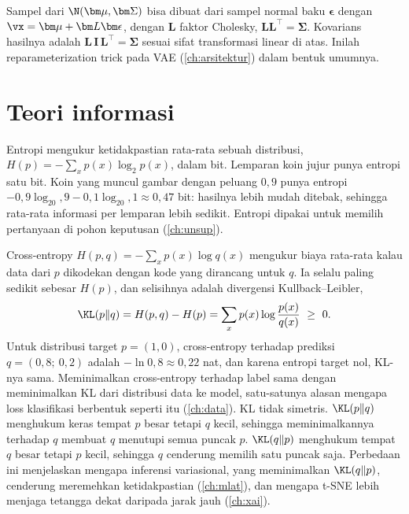 Sampel dari $\N(\bm\mu,\bm\Sigma)$ bisa dibuat dari sampel normal baku $\bm\epsilon$ dengan $\vx=\bm\mu+\bm L\bm\epsilon$, dengan
$\bm L$ faktor Cholesky, $\bm L\bm L^\top=\bm\Sigma$. Kovarians hasilnya adalah $\bm L\,\bm I\,\bm L^\top=\bm\Sigma$ sesuai sifat
transformasi linear di atas. Inilah reparameterization trick pada VAE (\cref{ch:arsitektur}) dalam bentuk umumnya.

\section{Teori informasi}

Entropi mengukur ketidakpastian rata-rata sebuah distribusi, $H(p)=-\sum_xp(x)\log_2p(x)$, dalam bit. Lemparan koin jujur punya
entropi satu bit. Koin yang muncul gambar dengan peluang $0{,}9$ punya entropi
$-0{,}9\log_20{,}9-0{,}1\log_20{,}1\approx0{,}47$ bit: hasilnya lebih mudah ditebak, sehingga rata-rata informasi per lemparan lebih
sedikit. Entropi dipakai untuk memilih pertanyaan di pohon keputusan (\cref{ch:unsup}).

Cross-entropy $H(p,q)=-\sum_xp(x)\log q(x)$ mengukur biaya rata-rata kalau data dari $p$ dikodekan dengan kode yang dirancang untuk
$q$. Ia selalu paling sedikit sebesar $H(p)$, dan selisihnya adalah divergensi Kullback--Leibler,
\begin{equation}
\KL(p\|q)=H(p,q)-H(p)=\sum_xp(x)\log\frac{p(x)}{q(x)}\ \ge\ 0 .
\end{equation}
Untuk distribusi target $p=(1,0)$, cross-entropy terhadap prediksi $q=(0{,}8;\ 0{,}2)$ adalah $-\ln0{,}8\approx0{,}22$ nat, dan karena
entropi target nol, KL-nya sama. Meminimalkan cross-entropy terhadap label sama dengan meminimalkan KL dari distribusi data ke
model, satu-satunya alasan mengapa loss klasifikasi berbentuk seperti itu (\cref{ch:data}). KL tidak simetris. $\KL(p\|q)$ menghukum
keras tempat $p$ besar tetapi $q$ kecil, sehingga meminimalkannya terhadap $q$ membuat $q$ menutupi semua puncak $p$.
$\KL(q\|p)$ menghukum tempat $q$ besar tetapi $p$ kecil, sehingga $q$ cenderung memilih satu puncak saja. Perbedaan ini
menjelaskan mengapa inferensi variasional, yang meminimalkan $\KL(q\|p)$, cenderung meremehkan ketidakpastian
(\cref{ch:mlat}), dan mengapa t-SNE lebih menjaga tetangga dekat daripada jarak jauh (\cref{ch:xai}).
